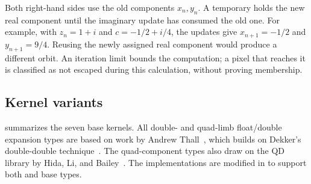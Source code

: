 Both right-hand sides use the old components $x_n,y_n$. A temporary holds the new
real component until the imaginary update has consumed the old one. For example,
with $z_n=1+i$ and $c=-1/2+i/4$, the updates give $x_{n+1}=-1/2$ and
$y_{n+1}=9/4$. Reusing the newly assigned real component would produce a different
orbit. An iteration limit bounds the computation; a pixel that reaches it is
classified as not escaped during this calculation, without proving membership.

\subsection{Kernel variants}

 summarizes the seven base kernels. All double- and
quad-limb float/double expansion types are based on work by Andrew
Thall~\cite{andrew-thall-dblflt}, which builds on Dekker's
double-double technique~\cite{Dekker1971DoubleDouble}. The quad-component
types also draw on the QD library by Hida, Li, and
Bailey~\cite{Hida2001QD}. The implementations are modified in
\FractalShark{} to support both  and  base types.

